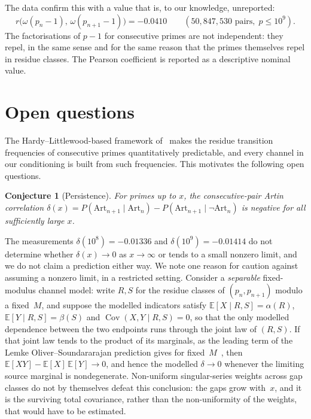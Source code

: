 \documentclass[11pt]{amsart}
\newtheorem{conjecture}{Conjecture}
\theoremstyle{definition}
\newcommand{\Art}{\mathrm{Art}}
\newcommand{\E}{\mathbb{E}}
\begin{document}
The data confirm this with a value that is, to our knowledge, unreported:
\[
	r\bigl(\omega(p_n - 1),\, \omega(p_{n+1} - 1)\bigr) = -0.0410
	\qquad (50{,}847{,}530 \text{ pairs}, \; p \le 10^9).
\]
The factorisations of $p - 1$ for consecutive primes are not independent: they
repel, in the same sense and for the same reason that the primes themselves
repel in residue classes. The Pearson coefficient is reported as a descriptive
nominal value.

\section{Open questions}
\label{sec:questions}

The Hardy--Littlewood-based framework of~\cite{LOS2016} makes the residue
transition frequencies of consecutive primes quantitatively predictable, and
every channel in our conditioning is built from such frequencies. This
motivates the following open questions.

\begin{conjecture}[Persistence]
	\label{conj:persist}
	For primes up to $x$, the consecutive-pair Artin correlation
	$\delta(x) = P(\Art_{n+1} \mid \Art_n) - P(\Art_{n+1} \mid \lnot\Art_n)$
	is negative for all sufficiently large $x$.
\end{conjecture}

The measurements $\delta(10^8) = -0.01336$ and $\delta(10^9) = -0.01414$ do
not determine whether $\delta(x) \to 0$ as $x \to \infty$ or tends to a
small nonzero limit, and we do not claim a prediction either way. We note one
reason for caution against assuming a nonzero limit, in a restricted setting.
Consider a \emph{separable} fixed-modulus channel model: write $R, S$ for the
residue classes of $(p_n, p_{n+1})$ modulo a fixed~$M$, and suppose the
modelled indicators satisfy $\E[X \mid R,S] = \alpha(R)$,
$\E[Y \mid R,S] = \beta(S)$ and $\operatorname{Cov}(X, Y \mid R,S) = 0$, so
that the only modelled dependence between the two endpoints runs through the
joint law of $(R,S)$. If that joint law tends to the product of its
marginals, as the leading term of the Lemke Oliver--Soundararajan prediction
gives for fixed~$M$~\cite{LOS2016}, then
$\E[XY] - \E[X]\,\E[Y] \to 0$, and hence the modelled $\delta \to 0$ whenever
the limiting source marginal is nondegenerate. Non-uniform singular-series
weights across gap classes do not by themselves defeat this conclusion: the
gaps grow with~$x$, and it is the surviving total covariance, rather than the
non-uniformity of the weights, that would have to be estimated.
\end{document}
